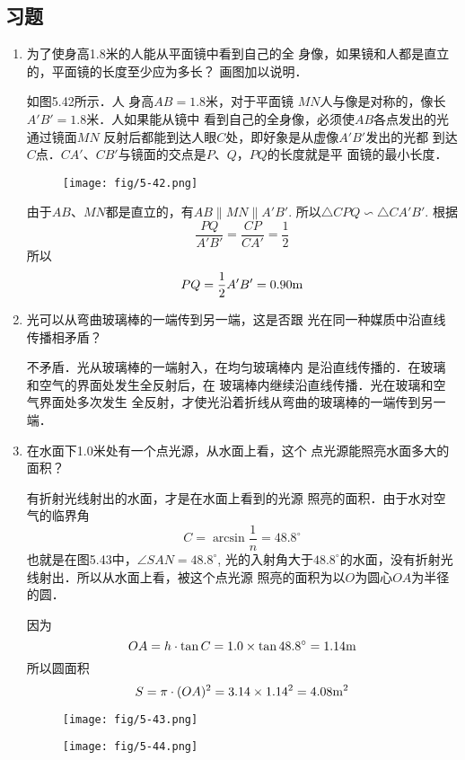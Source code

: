 \subsection{习题}
\begin{enumerate}
    \item 为了使身高1.8米的人能从平面镜中看到自己的全
身像，如果镜和人都是直立的，平面镜的长度至少应为多长？
画图加以说明．

\begin{solution}
如图5.42所示．人 
身高$AB=1.8$米，对于平面镜
$MN$人与像是对称的，像长$A'B'=1.8$米．人如果能从镜中
看到自己的全身像，必须使$AB$各点发出的光通过镜面$MN$
反射后都能到达人眼$C$处，即好象是从虚像$A'B'$发出的光都
到达$C$点．$CA'$、$CB'$与镜面的交点是$P$、$Q$，$PQ$的长度就是平
面镜的最小长度．
\begin{figure}[htp]
    \centering
    \texttt{[image: fig/5-42.png]}
    \caption{}
\end{figure}

由于$AB$、$MN$都是直立的，有$AB\parallel MN\parallel A'B'$. 所以$\triangle CPQ\backsim \triangle CA'B'$. 根据
\[\frac{PQ}{A'B'}=\frac{CP}{CA'}=\frac{1}{2}\]
所以
\[PQ=\frac{1}{2}A'B'=0.90{\rm m}\]
\end{solution}
\item 光可以从弯曲玻璃棒的一端传到另一端，这是否跟
光在同一种媒质中沿直线传播相矛盾？

\begin{solution}
    不矛盾．光从玻璃棒的一端射入，在均匀玻璃棒内
    是沿直线传播的．在玻璃和空气的界面处发生全反射后，在
    玻璃棒内继续沿直线传播．光在玻璃和空气界面处多次发生
    全反射，才使光沿着折线从弯曲的玻璃棒的一端传到另一端．
\end{solution}
\item 在水面下1.0米处有一个点光源，从水面上看，这个
点光源能照亮水面多大的面积？

\begin{solution}
    有折射光线射出的水面，才是在水面上看到的光源
    照亮的面积．由于水对空气的临界角
\[    C=\arcsin\frac{1}{n}=48.8^{\circ}\]
    也就是在图5.43中，$\angle SAN=48.8^{\circ}$, 光的入射角大于$48.8^{\circ}$的水面，没有折射光线射出．所以从水面上看，被这个点光源
    照亮的面积为以$O$为圆心$OA$为半径的圆．

    因为
    \[OA=h\cdot \tan C=1.0\times\tan48.8^{\circ}=1.14{\rm m}\]
    所以圆面积
    \[S=\pi\cdot (OA)^2=3.14\times1.14^2=4.08{\rm m^2}\]
\end{solution}

\begin{figure}[htp]\centering
    \begin{minipage}[t]{0.48\textwidth}
    \centering
\texttt{[image: fig/5-43.png]}
    \caption{}
    \end{minipage}
    \begin{minipage}[t]{0.48\textwidth}
    \centering
\texttt{[image: fig/5-44.png]}
    \caption{}
    \end{minipage}
    \end{figure}


\end{enumerate}
